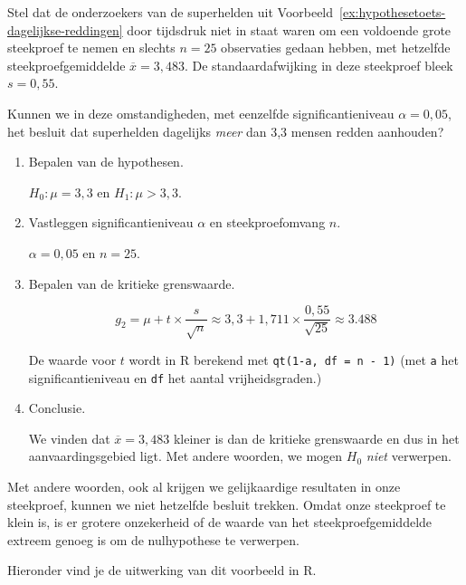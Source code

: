 \begin{example}
  \label{ex:t-toets-dagelijkse-reddingen}
  Stel dat de onderzoekers van de superhelden uit Voorbeeld~\ref{ex:hypothesetoets-dagelijkse-reddingen} door tijdsdruk niet in staat waren om een voldoende grote steekproef te nemen en slechts $n = 25$ observaties gedaan hebben, met hetzelfde steekproefgemiddelde $\overline{x} = 3,483$. De standaardafwijking in deze steekproef bleek $s = 0,55$.
  
  Kunnen we in deze omstandigheden, met eenzelfde significantieniveau $\alpha = 0,05$, het besluit dat superhelden dagelijks \emph{meer} dan 3,3 mensen redden aanhouden?
  
  \begin{enumerate}
    \item Bepalen van de hypothesen.
    
      $H_{0} : \mu = 3,3$ en $H_{1}: \mu > 3,3$.
    
    \item Vastleggen significantieniveau $\alpha$ en steekproefomvang $n$.
    
    $\alpha = 0,05$ en $n=25$.
    
    \item Bepalen van de kritieke grenswaarde.
    
    \[ g_{2} = \mu + t \times \frac{s}{\sqrt{n}} \approx 3,3 + 1,711 \times \frac{0,55}{\sqrt{25}} \approx 3.488 \]
    
    De waarde voor $t$ wordt in R berekend met \texttt{qt(1-a, df = n - 1)} (met \texttt{a} het significantieniveau en \texttt{df} het aantal vrijheidsgraden.)
    
    \item Conclusie.
    
    We vinden dat $\overline{x} = 3,483$ kleiner is dan de kritieke grenswaarde en dus in het aanvaardingsgebied ligt. Met andere woorden, we mogen $H_{0}$ \emph{niet} verwerpen.
  \end{enumerate}

  Met andere woorden, ook al krijgen we gelijkaardige resultaten in onze steekproef, kunnen we niet hetzelfde besluit trekken. Omdat onze steekproef te klein is, is er grotere onzekerheid of de waarde van het steekproefgemiddelde extreem genoeg is om de nulhypothese te verwerpen.
  
  Hieronder vind je de uitwerking van dit voorbeeld in R.
\end{example}



